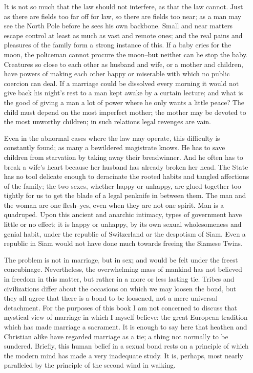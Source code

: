 \documentclass[final,10pt,letterpaper,twocolumn,openany]{book}
\begin{document}
It is not so much that the law
should not interfere, as that the law cannot. Just as there are fields too far
off for law, so there are fields too near; as a man may see the North Pole
before he sees his own backbone. Small and near matters escape control at
least as much as vast and remote ones; and the real pains and pleasures of
the family form a strong instance of this. If a baby cries for the moon, the
policeman cannot procure the moon--but neither can he stop the baby.
Creatures so close to each other as husband and wife, or a mother and
children, have powers of making each other happy or miserable with
which no public coercion can deal. If a marriage could be dissolved every
morning it would not give back his night's rest to a man kept awake by a
curtain lecture; and what is the good of giving a man a lot of power where
he only wants a little peace? The child must depend on the most imperfect
mother; the mother may be devoted to the most unworthy children; in such
relations legal revenges are vain. 

Even in the abnormal cases where the
law may operate, this difficulty is constantly found; as many a bewildered
magistrate knows. He has to save children from starvation by taking away
their breadwinner. And he often has to break a wife's heart because her
husband has already broken her head. The State has no tool delicate
enough to deracinate the rooted habits and tangled affections of the family;
the two sexes, whether happy or unhappy, are glued together too tightly
for us to get the blade of a legal penknife in between them. The man and
the woman are one flesh--yes, even when they are not one spirit. Man is a
quadruped. Upon this ancient and anarchic intimacy, types of government
have little or no effect; it is happy or unhappy, by its own sexual
wholesomeness and genial habit, under the republic of Switzerland or the
despotism of Siam. Even a republic in Siam would not have done much
towards freeing the Siamese Twins.

The problem is not in marriage, but in sex; and would be felt under the
freest concubinage. Nevertheless, the overwhelming mass of mankind has
not believed in freedom in this matter, but rather in a more or less lasting
tie. Tribes and civilizations differ about the occasions on which we may
loosen the bond, but they all agree that there is a bond to be loosened, not
a mere universal detachment. For the purposes of this book I am not
concerned to discuss that mystical view of marriage in which I myself
believe: the great European tradition which has made marriage a
sacrament. It is enough to say here that heathen and Christian alike have
regarded marriage as a tie; a thing not normally to be sundered. Briefly,
this human belief in a sexual bond rests on a principle of which the
modern mind has made a very inadequate study. It is, perhaps, most nearly
paralleled by the principle of the second wind in walking.
\end{document}
